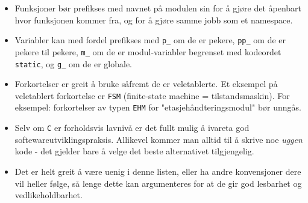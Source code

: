 \begin{itemize}
    \item Funksjoner bør prefikses med navnet på modulen sin for å gjøre det åpenbart hvor funksjonen kommer fra, og for å gjøre samme jobb som et namespace.
    \item Variabler kan med fordel prefikses med \verb|p_| om de er pekere, \verb|pp_| om de er pekere til pekere, \verb|m_| om de er modul-variabler begrenset med kodeordet \verb|static|, og \verb|g_| om de er globale.
    
    \item Forkortelser er greit å bruke såfremt de er veletablerte. Et eksempel på veletablert forkortelse er \verb|FSM| (finite-state machine = tilstandsmaskin). For eksempel: forkortelser av typen \verb|EHM| for "etasjehåndteringsmodul" bør unngås.
    
    
    
    \item Selv om \verb|C| er forholdsvis lavnivå er det fullt mulig å ivareta god softewareutviklingspraksis. Allikevel kommer man alltid til å skrive noe \textit{uggen} kode - det gjelder bare å velge det beste alternativet tilgjengelig.
    
    \item Det er helt greit å være uenig i denne listen, eller ha andre konvensjoner dere vil heller følge, så lenge dette kan argumenteres for at de gir god lesbarhet og vedlikeholdbarhet.
\end{itemize}